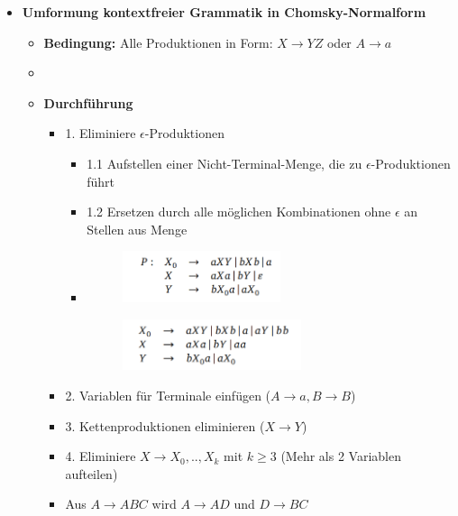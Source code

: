 \documentclass[11pt,a4paper]{article}
\begin{document}
\begin{itemize}
\item {\large \textbf{Umformung kontextfreier Grammatik in Chomsky-Normalform}}
	\begin{itemize}
	\item \textbf{Bedingung:} Alle Produktionen in Form: $X \rightarrow YZ$ oder $A \rightarrow a$
	\item[]
	\item \textbf{Durchführung}
		\begin{itemize}
		\item 1. Eliminiere $\epsilon$-Produktionen	
			\begin{itemize}
			\item 1.1 Aufstellen einer Nicht-Terminal-Menge, die zu $\epsilon$-Produktionen führt
			\item 1.2 Ersetzen durch alle möglichen Kombinationen ohne $\epsilon$ an Stellen aus Menge
			\item[]
				\begin{minipage}{0.4\textwidth}
					\begin{figure}[H]
					\includegraphics[height=1.5cm]{epsi1}
					\end{figure}
				\end{minipage}
				\begin{minipage}[t]{0.4\textwidth}
					\vspace{-1cm}
					\begin{figure}[H]
					\includegraphics[height=1.5cm]{epsi2}
					\end{figure}
				\end{minipage}
			\end{itemize}
		\item 2. Variablen für Terminale einfügen ($A \rightarrow a, B \rightarrow B$)
		\item 3. Kettenproduktionen eliminieren ($X \rightarrow Y$)
		\item 4. Eliminiere $X \rightarrow X_0,..,X_k$ mit $k \geq 3$ (Mehr als 2 Variablen aufteilen)
		\item Aus $A \rightarrow ABC$ wird $A \rightarrow AD$ und $D \rightarrow BC$
		\end{itemize}
		

\end{itemize}
\end{itemize}
\end{document}
